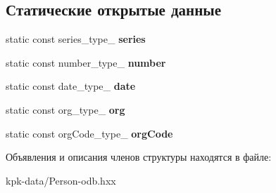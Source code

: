 \subsection*{Статические открытые данные}
\begin{DoxyCompactItemize}
\item 
static const series\+\_\+type\+\_\+ {\bfseries series}\hypertarget{structodb_1_1pointer__query__columns_3_01_1_1kpk_1_1data_1_1_person_00_01id__pgsql_00_01_a_01_4_1_1passport__class___afbd7b4ee095a17098ec5fb78af10c815}{}\label{structodb_1_1pointer__query__columns_3_01_1_1kpk_1_1data_1_1_person_00_01id__pgsql_00_01_a_01_4_1_1passport__class___afbd7b4ee095a17098ec5fb78af10c815}

\item 
static const number\+\_\+type\+\_\+ {\bfseries number}\hypertarget{structodb_1_1pointer__query__columns_3_01_1_1kpk_1_1data_1_1_person_00_01id__pgsql_00_01_a_01_4_1_1passport__class___a2ee510830677cad21422bdd1f59f0f3d}{}\label{structodb_1_1pointer__query__columns_3_01_1_1kpk_1_1data_1_1_person_00_01id__pgsql_00_01_a_01_4_1_1passport__class___a2ee510830677cad21422bdd1f59f0f3d}

\item 
static const date\+\_\+type\+\_\+ {\bfseries date}\hypertarget{structodb_1_1pointer__query__columns_3_01_1_1kpk_1_1data_1_1_person_00_01id__pgsql_00_01_a_01_4_1_1passport__class___adae55686fc277be428cbbed6e1e1e61b}{}\label{structodb_1_1pointer__query__columns_3_01_1_1kpk_1_1data_1_1_person_00_01id__pgsql_00_01_a_01_4_1_1passport__class___adae55686fc277be428cbbed6e1e1e61b}

\item 
static const org\+\_\+type\+\_\+ {\bfseries org}\hypertarget{structodb_1_1pointer__query__columns_3_01_1_1kpk_1_1data_1_1_person_00_01id__pgsql_00_01_a_01_4_1_1passport__class___a63b6a22c3bf8169c90591879ca63ae75}{}\label{structodb_1_1pointer__query__columns_3_01_1_1kpk_1_1data_1_1_person_00_01id__pgsql_00_01_a_01_4_1_1passport__class___a63b6a22c3bf8169c90591879ca63ae75}

\item 
static const org\+Code\+\_\+type\+\_\+ {\bfseries org\+Code}\hypertarget{structodb_1_1pointer__query__columns_3_01_1_1kpk_1_1data_1_1_person_00_01id__pgsql_00_01_a_01_4_1_1passport__class___aea754ebf86689eeed052b6caaf1f850c}{}\label{structodb_1_1pointer__query__columns_3_01_1_1kpk_1_1data_1_1_person_00_01id__pgsql_00_01_a_01_4_1_1passport__class___aea754ebf86689eeed052b6caaf1f850c}

\end{DoxyCompactItemize}


Объявления и описания членов структуры находятся в файле\+:\begin{DoxyCompactItemize}
\item 
kpk-\/data/Person-\/odb.\+hxx\end{DoxyCompactItemize}
